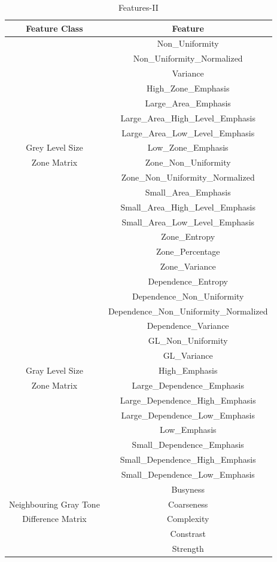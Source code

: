 \documentclass[10pt,journal,compsoc]{IEEEtran}
\begin{document}
\begin{table}[!b]
\centering
\caption{Features-II}
\label{tb4}
\begin{tabular}{| c | c |}
\hline
Feature Class & Feature\\
\hline
&Non\_Uniformity\\
&Non\_Uniformity\_Normalized\\
&Variance\\
&High\_Zone\_Emphasis\\
&Large\_Area\_Emphasis\\
&Large\_Area\_High\_Level\_Emphasis\\
&Large\_Area\_Low\_Level\_Emphasis\\
Grey Level Size&Low\_Zone\_Emphasis\\
Zone Matrix&Zone\_Non\_Uniformity\\
&Zone\_Non\_Uniformity\_Normalized\\
&Small\_Area\_Emphasis\\
&Small\_Area\_High\_Level\_Emphasis\\
&Small\_Area\_Low\_Level\_Emphasis\\
&Zone\_Entropy\\
&Zone\_Percentage\\
&Zone\_Variance\\
\hline
&Dependence\_Entropy\\
&Dependence\_Non\_Uniformity\\
&Dependence\_Non\_Uniformity\_Normalized\\
&Dependence\_Variance\\
&GL\_Non\_Uniformity\\
&GL\_Variance\\
Gray Level Size&High\_Emphasis\\
Zone Matrix&Large\_Dependence\_Emphasis\\
&Large\_Dependence\_High\_Emphasis\\
&Large\_Dependence\_Low\_Emphasis\\
&Low\_Emphasis\\
&Small\_Dependence\_Emphasis\\
&Small\_Dependence\_High\_Emphasis\\
&Small\_Dependence\_Low\_Emphasis\\
\hline
&Busyness\\
Neighbouring Gray Tone&Coarseness\\
Difference Matrix&Complexity\\
&Constrast\\
&Strength\\
\hline
\end{tabular}
\end{table}
\end{document}
